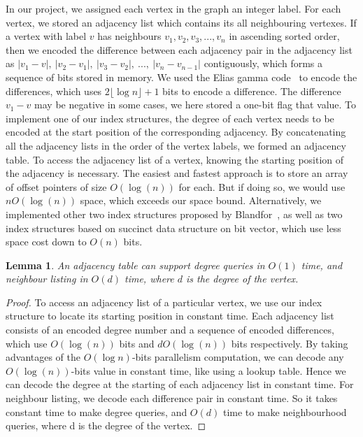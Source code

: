 \documentclass[12pt,glossary]{dalthesis}
\newtheorem{lemma}[theorem]{Lemma}
\begin{document}
In our project, we assigned each vertex in the graph an integer label. For each vertex, we stored an adjacency list which contains its all neighbouring vertexes. If a vertex with label $v$ has neighbours $v_{1}, v_{2}, v_{3}, ...,v_{n}$ in ascending sorted order, then we encoded the difference between each adjacency pair in the adjacency list as $|v_{1}-v|, \ |v_{2}-v_{1}|,\  |v_{3}-v_{2}|,\ ...,\ |v_{n}-v_{n-1}|$ contiguously, which forms a sequence of bits stored in memory. We used the Elias gamma code~\cite{Gamma} to encode the differences, which uses $2\lfloor \log n \rfloor + 1$ bits to encode a difference. The difference $v_{1} - v$ may be negative in some cases, we here stored a one-bit flag that value. To implement one of our index structures, the degree of each vertex needs to be encoded at the start position of the corresponding adjacency. By concatenating all the adjacency lists in the order of the vertex labels, we formed an adjacency table. To access the adjacency list of a vertex, knowing the starting position of the adjacency
is necessary. The easiest and fastest approach is to store an array of offset pointers of size $O(\log (n))$ for each. But if doing so, we would use $nO(\log (n))$ space, which exceeds our space bound. Alternatively, we implemented other two index structures proposed by Blandfor~\cite{compact-representation}, as well as two index structures based on succinct data structure on bit vector, which use less space cost down to $O(n)$ bits.
\bigskip
\begin{lemma}
An adjacency table can support degree queries in $O(1)$ time, and neighbour
listing in $O(d)$ time, where $d$ is the degree of the vertex.
\end{lemma}
\bigskip 
\begin{proof}
To access an adjacency list of a particular vertex, we use our index structure to locate its starting position in constant time. Each adjacency list consists of an encoded degree number and a sequence of encoded differences, which use $O(\log (n))$ bits and $dO(\log (n))$ bits respectively. By taking advantages of the $O(\log n)$-bits parallelism computation, we can decode any $O(\log (n))$-bits value in constant time, like using a lookup table. Hence we can decode the degree at the starting of each adjacency list in constant time. For neighbour listing, we decode each difference pair in constant time. So it takes constant time to make degree queries, and $O(d)$ time to make neighbourhood queries, where d is the degree of the vertex.
\end{proof}
\end{document}
